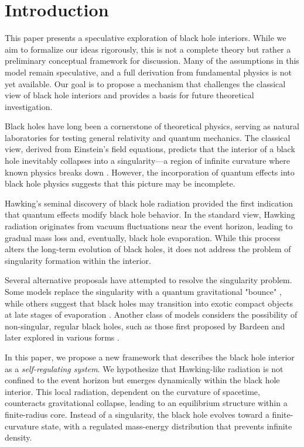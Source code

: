 \section{Introduction}

This paper presents a speculative exploration of black hole interiors. While we aim to formalize our ideas rigorously, this is not a complete theory but rather a preliminary conceptual framework for discussion. Many of the assumptions in this model remain speculative, and a full derivation from fundamental physics is not yet available. Our goal is to propose a mechanism that challenges the classical view of black hole interiors and provides a basis for future theoretical investigation.

Black holes have long been a cornerstone of theoretical physics, serving as natural laboratories for testing general relativity and quantum mechanics. The classical view, derived from Einstein’s field equations, predicts that the interior of a black hole inevitably collapses into a singularity—a region of infinite curvature where known physics breaks down \cite{penrose1965singularity}. However, the incorporation of quantum effects into black hole physics suggests that this picture may be incomplete.

Hawking’s seminal discovery of black hole radiation \cite{hawking1975particle} provided the first indication that quantum effects modify black hole behavior. In the standard view, Hawking radiation originates from vacuum fluctuations near the event horizon, leading to gradual mass loss and, eventually, black hole evaporation. While this process alters the long-term evolution of black holes, it does not address the problem of singularity formation within the interior.

Several alternative proposals have attempted to resolve the singularity problem. Some models replace the singularity with a quantum gravitational "bounce" \cite{bojowald2005nonsingular}, while others suggest that black holes may transition into exotic compact objects at late stages of evaporation \cite{frolov2017information}. Another class of models considers the possibility of non-singular, regular black holes, such as those first proposed by Bardeen \cite{bardeen1968non} and later explored in various forms \cite{hayward2006formation}.

In this paper, we propose a new framework that describes the black hole interior as a \textit{self-regulating system}. We hypothesize that Hawking-like radiation is not confined to the event horizon but emerges dynamically within the black hole interior. This local radiation, dependent on the curvature of spacetime, counteracts gravitational collapse, leading to an equilibrium structure within a finite-radius core. Instead of a singularity, the black hole evolves toward a finite-curvature state, with a regulated mass-energy distribution that prevents infinite density. 

